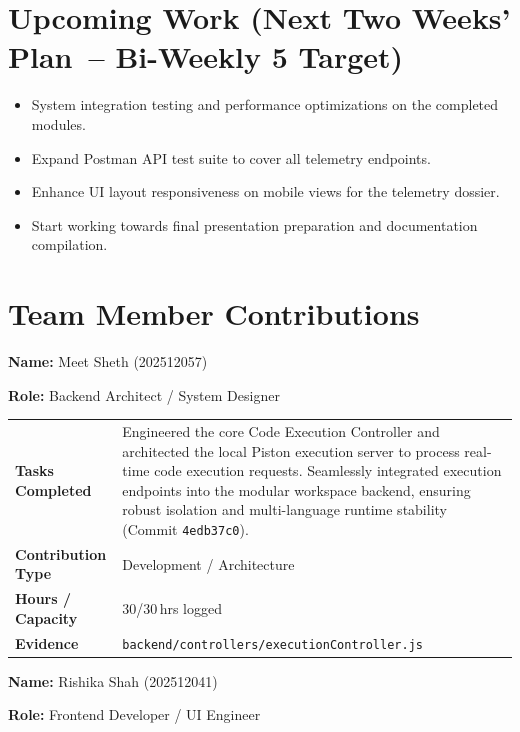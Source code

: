 \documentclass[11pt,a4paper]{article}
\newcommand{\field}[2]{\textbf{#1:} #2\par}
\begin{document}
\section{Upcoming Work (Next Two Weeks' Plan~-- Bi-Weekly 5 Target)}

\begin{itemize}
    \item System integration testing and performance optimizations on the completed modules.
    \item Expand Postman API test suite to cover all telemetry endpoints.
    \item Enhance UI layout responsiveness on mobile views for the telemetry dossier.
    \item Start working towards final presentation preparation and documentation compilation.
\end{itemize}

\section{Team Member Contributions}

\vspace{6pt}

\field{Name}{Meet Sheth (202512057)}
\field{Role}{Backend Architect / System Designer}

\vspace{4pt}
{\small
\begin{tabular}{>{\bfseries}p{} p{}}
\toprule
Tasks Completed & Engineered the core Code Execution Controller and architected the local Piston execution server to process real-time code execution requests. Seamlessly integrated execution endpoints into the modular workspace backend, ensuring robust isolation and multi-language runtime stability (Commit \texttt{4edb37c0}). \\
Contribution Type & Development / Architecture \\
Hours / Capacity & 30/30\,hrs logged \\
Evidence & \texttt{backend/controllers/executionController.js} \\
\bottomrule
\end{tabular}
}

\vspace{6pt}

\field{Name}{Rishika Shah (202512041)}
\field{Role}{Frontend Developer / UI Engineer}
\end{document}
